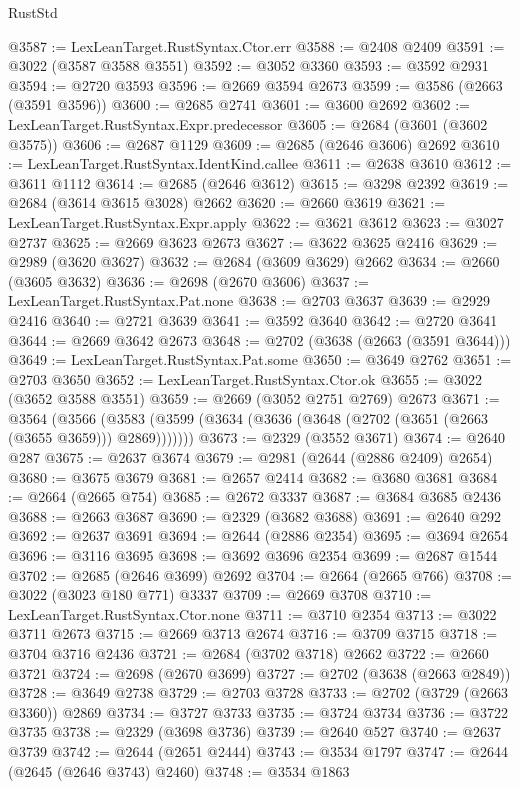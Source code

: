 \begin{lexlean}{RustStd}
\begin{coremodule}
@3587 := LexLeanTarget.RustSyntax.Ctor.err
@3588 := @2408 @2409
@3591 := @3022 (@3587 @3588 @3551)
@3592 := @3052 @3360
@3593 := @3592 @2931
@3594 := @2720 @3593
@3596 := @2669 @3594 @2673
@3599 := @3586 (@2663 (@3591 @3596))
@3600 := @2685 @2741
@3601 := @3600 @2692
@3602 := LexLeanTarget.RustSyntax.Expr.predecessor
@3605 := @2684 (@3601 (@3602 @3575))
@3606 := @2687 @1129
@3609 := @2685 (@2646 @3606) @2692
@3610 := LexLeanTarget.RustSyntax.IdentKind.callee
@3611 := @2638 @3610
@3612 := @3611 @1112
@3614 := @2685 (@2646 @3612)
@3615 := @3298 @2392
@3619 := @2684 (@3614 @3615 @3028) @2662
@3620 := @2660 @3619
@3621 := LexLeanTarget.RustSyntax.Expr.apply
@3622 := @3621 @3612
@3623 := @3027 @2737
@3625 := @2669 @3623 @2673
@3627 := @3622 @3625 @2416
@3629 := @2989 (@3620 @3627)
@3632 := @2684 (@3609 @3629) @2662
@3634 := @2660 (@3605 @3632)
@3636 := @2698 (@2670 @3606)
@3637 := LexLeanTarget.RustSyntax.Pat.none
@3638 := @2703 @3637
@3639 := @2929 @2416
@3640 := @2721 @3639
@3641 := @3592 @3640
@3642 := @2720 @3641
@3644 := @2669 @3642 @2673
@3648 := @2702 (@3638 (@2663 (@3591 @3644)))
@3649 := LexLeanTarget.RustSyntax.Pat.some
@3650 := @3649 @2762
@3651 := @2703 @3650
@3652 := LexLeanTarget.RustSyntax.Ctor.ok
@3655 := @3022 (@3652 @3588 @3551)
@3659 := @2669 (@3052 @2751 @2769) @2673
@3671 := @3564
    (@3566 (@3583 (@3599 (@3634 (@3636 (@3648 (@2702 (@3651 (@2663 (@3655 @3659))) @2869)))))))
@3673 := @2329 (@3552 @3671)
@3674 := @2640 @287
@3675 := @2637 @3674
@3679 := @2981 (@2644 (@2886 @2409) @2654)
@3680 := @3675 @3679
@3681 := @2657 @2414
@3682 := @3680 @3681
@3684 := @2664 (@2665 @754)
@3685 := @2672 @3337
@3687 := @3684 @3685 @2436
@3688 := @2663 @3687
@3690 := @2329 (@3682 @3688)
@3691 := @2640 @292
@3692 := @2637 @3691
@3694 := @2644 (@2886 @2354)
@3695 := @3694 @2654
@3696 := @3116 @3695
@3698 := @3692 @3696 @2354
@3699 := @2687 @1544
@3702 := @2685 (@2646 @3699) @2692
@3704 := @2664 (@2665 @766)
@3708 := @3022 (@3023 @180 @771) @3337
@3709 := @2669 @3708
@3710 := LexLeanTarget.RustSyntax.Ctor.none
@3711 := @3710 @2354
@3713 := @3022 @3711 @2673
@3715 := @2669 @3713 @2674
@3716 := @3709 @3715
@3718 := @3704 @3716 @2436
@3721 := @2684 (@3702 @3718) @2662
@3722 := @2660 @3721
@3724 := @2698 (@2670 @3699)
@3727 := @2702 (@3638 (@2663 @2849))
@3728 := @3649 @2738
@3729 := @2703 @3728
@3733 := @2702 (@3729 (@2663 @3360)) @2869
@3734 := @3727 @3733
@3735 := @3724 @3734
@3736 := @3722 @3735
@3738 := @2329 (@3698 @3736)
@3739 := @2640 @527
@3740 := @2637 @3739
@3742 := @2644 (@2651 @2444)
@3743 := @3534 @1797
@3747 := @2644 (@2645 (@2646 @3743) @2460)
@3748 := @3534 @1863

\end{coremodule}
\end{lexlean}
